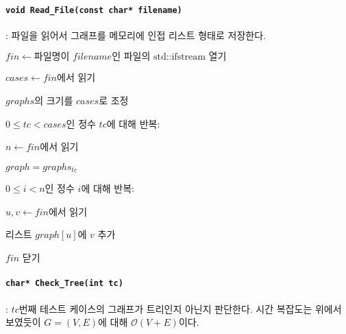 \paragraph{\texttt{void Read_File(const char* filename)}}: 파일을 읽어서
그래프를 메모리에 인접 리스트 형태로 저장한다.
\begin{algorithm}
	\item $fin \leftarrow \textrm{파일명이 }filename\textrm{인 파일의 std::ifstream 열기}$
	\item $cases \leftarrow fin$에서 읽기
	\item $graphs$의 크기를 $cases$로 조정
	\item $0 \leq tc < cases$인 정수 $tc$에 대해 반복:
	\begin{algorithm}
		\item $n \leftarrow fin$에서 읽기
		\item $graph = graphs_{tc}$
		\item $0 \leq i < n$인 정수 $i$에 대해 반복:
		\begin{algorithm}
			\item $u, v \leftarrow fin$에서 읽기
			\item 리스트 $graph[u]$에 $v$ 추가
		\end{algorithm}
	\end{algorithm}
	\item $fin$ 닫기
\end{algorithm}

\paragraph{\texttt{char* Check_Tree(int tc)}}: $tc$번째 테스트 케이스의 그래프가 트리인지 아닌지 판단한다.
시간 복잡도는 위에서 보였듯이 $G=\left(V, E\right)$에 대해 $\mathcal{O}\left(V + E\right)$이다.


